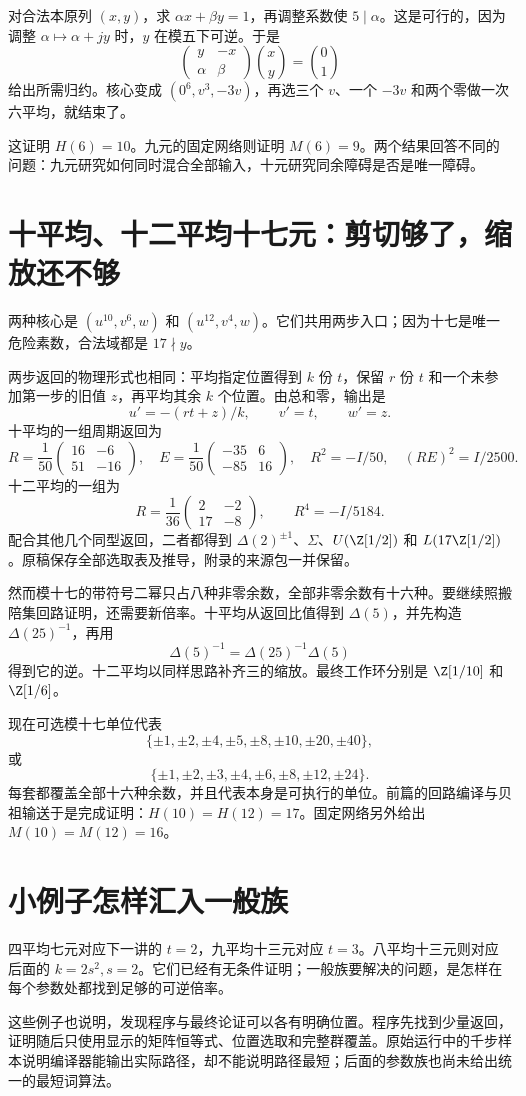 对合法本原列 $(x,y)$，求 $\alpha x+\beta y=1$，再调整系数使 $5\mid\alpha$。这是可行的，因为调整 $\alpha\mapsto\alpha+jy$ 时，$y$ 在模五下可逆。于是
\[
\begin{pmatrix}y&-x\\\alpha&\beta\end{pmatrix}
\binom{x}{y}=\binom01
\]
给出所需归约。核心变成 $(0^6,v^3,-3v)$，再选三个 $v$、一个 $-3v$ 和两个零做一次六平均，就结束了。

这证明 $H(6)=10$。九元的固定网络则证明 $M(6)=9$。两个结果回答不同的问题：九元研究如何同时混合全部输入，十元研究同余障碍是否是唯一障碍。

\section{十平均、十二平均十七元：剪切够了，缩放还不够}
两种核心是 $(u^{10},v^6,w)$ 和 $(u^{12},v^4,w)$。它们共用两步入口；因为十七是唯一危险素数，合法域都是 $17\nmid y$。

两步返回的物理形式也相同：平均指定位置得到 $k$ 份 $t$，保留 $r$ 份 $t$ 和一个未参加第一步的旧值 $z$，再平均其余 $k$ 个位置。由总和零，输出是
\[u'=-(rt+z)/k,\qquad v'=t,\qquad w'=z.
\]
十平均的一组周期返回为
\[
R=\frac1{50}\begin{pmatrix}16&-6\\51&-16\end{pmatrix},
\quad E=\frac1{50}\begin{pmatrix}-35&6\\-85&16\end{pmatrix},
\quad R^2=-I/50,\quad(RE)^2=I/2500.
\]
十二平均的一组为
\[
R=\frac1{36}\begin{pmatrix}2&-2\\17&-8\end{pmatrix},
\qquad R^4=-I/5184.
\]
配合其他几个同型返回，二者都得到 $\Delta(2)^{\pm1}$、$\Sigma$、$U(\Z[1/2])$ 和 $L(17\Z[1/2])$。原稿保存全部选取表及推导，附录的来源包一并保留。

然而模十七的带符号二幂只占八种非零余数，全部非零余数有十六种。要继续照搬陪集回路证明，还需要新倍率。十平均从返回比值得到 $\Delta(5)$，并先构造 $\Delta(25)^{-1}$，再用
\[\Delta(5)^{-1}=\Delta(25)^{-1}\Delta(5)
\]
得到它的逆。十二平均以同样思路补齐三的缩放。最终工作环分别是 $\Z[1/10]$ 和 $\Z[1/6]$。

现在可选模十七单位代表
\[
\{\pm1,\pm2,\pm4,\pm5,\pm8,\pm10,\pm20,\pm40\},
\]
或
\[
\{\pm1,\pm2,\pm3,\pm4,\pm6,\pm8,\pm12,\pm24\}.
\]
每套都覆盖全部十六种余数，并且代表本身是可执行的单位。前篇的回路编译与贝祖输送于是完成证明：$H(10)=H(12)=17$。固定网络另外给出 $M(10)=M(12)=16$。

\section{小例子怎样汇入一般族}
四平均七元对应下一讲的 $t=2$，九平均十三元对应 $t=3$。八平均十三元则对应后面的 $k=2s^2,s=2$。它们已经有无条件证明；一般族要解决的问题，是怎样在每个参数处都找到足够的可逆倍率。

这些例子也说明，发现程序与最终论证可以各有明确位置。程序先找到少量返回，证明随后只使用显示的矩阵恒等式、位置选取和完整群覆盖。原始运行中的千步样本说明编译器能输出实际路径，却不能说明路径最短；后面的参数族也尚未给出统一的最短词算法。
